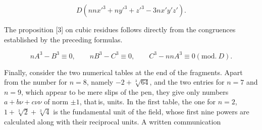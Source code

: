 \[
D(nnx'^3+ny'^3+z'^3-3nx'y'z').
\]

The proposition [3] on cubic residues follows directly from the congruences
established by the preceding formulas.

\[
nA^3-B^3 \equiv 0, \qquad nB^3-C^3 \equiv 0, \qquad C^3-nnA^3 \equiv 0 (\mathrm{mod.}\ D).
\]

Finally, consider the two numerical tables at the end of the fragments. Apart from
the number for $n=8$, namely $-2+\sqrt[3]{64}$, and the two
entries for $n=7$ and $n=9$, which appear to be mere slips of the pen, they
give only numbers $a+b\nu+c\nu\nu$ of norm $\pm 1$,
that\,is, units. In the first table, the one for $n=2$,
$1+\sqrt[3]{2}+\sqrt[3]{4}$ is the fundamental unit of the field, whose first
nine powers are calculated along with their reciprocal units. A written
communication%
